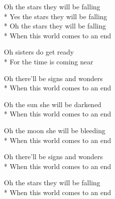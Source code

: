 
\contd
{}

\versemark
Oh the stars they will be falling\\*
Yes the stars they will be falling\\*
Oh the stars they will be falling\\*
When this world comes to an end

\versemark
Oh sisters do get ready\simile\\*
For the time is coming near

\versemark
Oh there'll be signs and wonders\simile\\*
When this world comes to an end

\versemark
Oh the sun she will be darkened\simile\\*
When this world comes to an end

\versemark
Oh the moon she will be bleeding\simile\\*
When this world comes to an end

\versemark
Oh there'll be signs and wonders\simile\\*
When this world comes to an end

\versemark
Oh the stars they will be falling\simile\\*
When this world comes to an end

